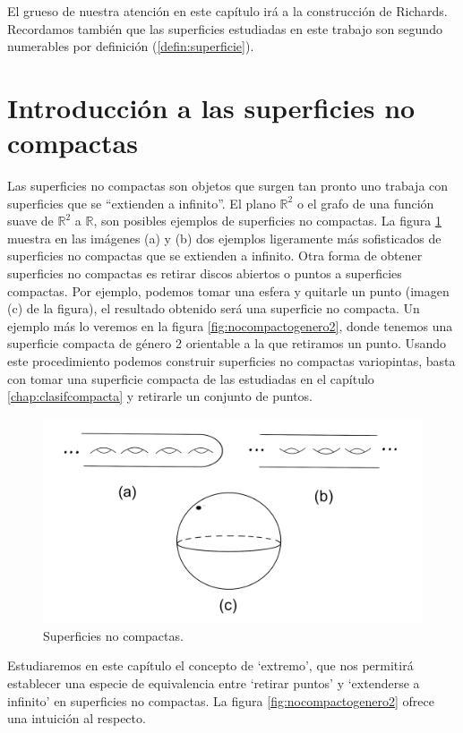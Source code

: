 \documentclass[a4paper,11pt,spanish, twoside, leqno]{tfg-uam}
\newcommand*{\reales}{\mathbb{R}}
\theoremstyle{definition}
\begin{document}
El grueso de nuestra atención en este capítulo irá a la construcción de Richards. Recordamos también que las superficies estudiadas en este trabajo son segundo numerables por definición (\ref{defin:superficie}). 
\section{Introducción a las superficies no compactas}
Las superficies no compactas son objetos que surgen tan pronto uno trabaja con superficies que se ``extienden a infinito''. El plano $\reales^2$ o el grafo de una función suave de $\reales^2$ a $\reales$, son posibles ejemplos de superficies no compactas. La figura \ref{fig:ejemplonocompactas} muestra en las imágenes (a) y (b) dos ejemplos ligeramente más sofisticados  de superficies no compactas que se extienden a infinito. Otra forma de obtener superficies no compactas es retirar discos abiertos o puntos a superficies compactas. Por ejemplo, podemos tomar una esfera y quitarle un punto (imagen (c) de la figura), el resultado obtenido será una superficie no compacta. Un ejemplo más  lo veremos en la figura \ref{fig:nocompactogenero2}, donde tenemos una superficie compacta de género 2 orientable a la que retiramos un punto. Usando este procedimiento podemos construir superficies no compactas variopintas, basta con tomar una superficie compacta de las estudiadas en el capítulo \ref{chap:clasifcompacta} y retirarle un conjunto de puntos. 

\begin{figure}[h!]
	\centering	\includegraphics[width=0.5\linewidth]{imagenes/ejemplonocompactas.png}
	\caption{Superficies no compactas.}
	\label{fig:ejemplonocompactas}
\end{figure}

Estudiaremos en este capítulo el concepto de `extremo', que nos permitirá establecer una especie de equivalencia entre `retirar puntos' y `extenderse a infinito' en superficies no compactas. La figura \ref{fig:nocompactogenero2} ofrece una intuición al respecto. 
\end{document}
